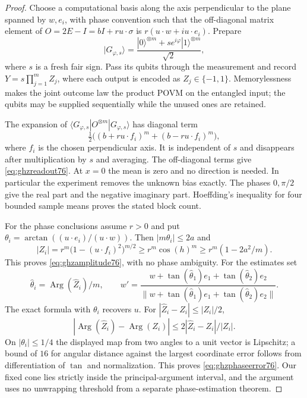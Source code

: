 \begin{proof}
Choose a computational basis along the axis perpendicular to the
plane spanned by $w,e_i$, with phase convention such that the
off-diagonal matrix element of
$O=2E-I=bI+ru\cdot\sigma$ is
$r(u\cdot w+i u\cdot e_i)$.  Prepare
\[
 |G_{\varphi,s}\rangle
       =\frac{|0\rangle^{\otimes m}
                    +s e^{i\varphi}|1\rangle^{\otimes m}}{\sqrt2},
\]
where $s$ is a fresh fair sign.  Pass its qubits through the
measurement and record $Y=s\prod_{j=1}^m Z_j$, where each output
is encoded as $Z_j\in\{-1,1\}$.  Memorylessness makes the joint
outcome law the product POVM on the entangled input; the qubits may
be supplied sequentially while the unused ones are retained.

The expansion of $\langle G_{\varphi,s}|O^{\otimes m}
|G_{\varphi,s}\rangle$ has diagonal term
\[
 \tfrac12\bigl((b+ru\cdot f_i)^m+(b-ru\cdot f_i)^m\bigr),
\]
where $f_i$ is the chosen perpendicular axis.  It is independent
of $s$ and disappears after multiplication by $s$ and averaging.
The off-diagonal terms give \eqref{eq:ghzreadout76}.  At $x=0$
the mean is zero and no direction is needed.  In particular
the experiment removes the unknown bias exactly.  The phases
$0,\pi/2$ give the real part and the negative imaginary part.
Hoeffding's inequality for four bounded sample means proves the
stated block count.

For the phase conclusions assume $r>0$ and put
$\theta_i=\arctan((u\cdot e_i)/(u\cdot w))$.  Then
$|m\theta_i|\le2a$ and
\[
 |Z_i|=r^m\bigl(1-(u\cdot f_i)^2\bigr)^{m/2}
       \ge r^m\cos(h)^m
       \ge r^m(1-2a^2/m).
\]
This proves \eqref{eq:ghzamplitude76}, with no phase ambiguity.
For the estimates set
\[
 \widehat\theta_i=\operatorname{Arg}(\widehat Z_i)/m,
 \qquad
 w'=\frac{w+\tan(\widehat\theta_1)e_1
                   +\tan(\widehat\theta_2)e_2}
              {\|w+\tan(\widehat\theta_1)e_1
                   +\tan(\widehat\theta_2)e_2\|}.
\]
The exact formula with $\theta_i$ recovers $u$.  For
$|\widehat Z_i-Z_i|\le|Z_i|/2$,
\[
 |\operatorname{Arg}(\widehat Z_i)-\operatorname{Arg}(Z_i)|
       \le2|\widehat Z_i-Z_i|/|Z_i|.
\]
On $|\theta_i|\le1/4$ the displayed map from two angles to a unit
vector is Lipschitz; a bound of $16$ for angular distance against
the largest coordinate error follows from differentiation of
$\tan$ and normalization.  This proves
\eqref{eq:ghzphaseerror76}.  Our fixed cone lies strictly inside
the principal-argument interval, and the argument uses no
unwrapping threshold from a separate phase-estimation theorem.
\end{proof}

